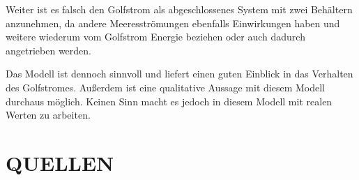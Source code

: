 \documentclass[a4paper,twoside]{article}
\begin{document}
	Weiter ist es falsch den Golfstrom als abgeschlossenes System mit zwei Behältern anzunehmen, da andere Meeresströmungen ebenfalls Einwirkungen haben und weitere wiederum vom Golfstrom Energie beziehen oder auch dadurch angetrieben werden.
	
	Das Modell ist dennoch sinnvoll und liefert einen guten Einblick in das Verhalten des Golfstromes. Außerdem ist eine qualitative Aussage mit diesem Modell durchaus möglich. Keinen Sinn macht es jedoch in diesem Modell mit realen Werten zu arbeiten. 
	
 	\section{\uppercase{Quellen}}\label{sec: Quellen}		

	\nocite{*}
	
	
\end{document}
